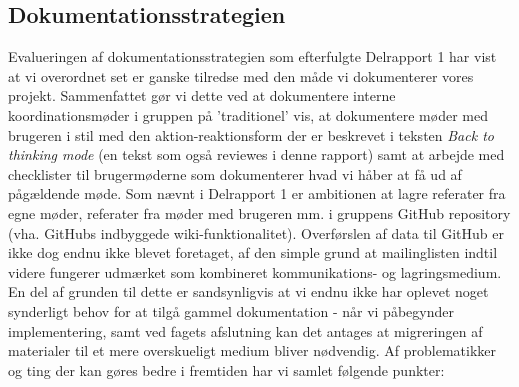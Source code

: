 \documentclass[10pt,a4paper,danish]{article}
\begin{document}
\subsection{Dokumentationsstrategien}
Evalueringen af dokumentationsstrategien som efterfulgte Delrapport 1 har vist at vi overordnet set er ganske tilredse med den måde vi dokumenterer vores projekt. Sammenfattet gør vi dette ved at dokumentere interne koordinationsmøder i gruppen på 'traditionel' vis, at dokumentere møder med brugeren i stil med den aktion-reaktionsform der er beskrevet i teksten \emph{Back to thinking mode} (en tekst som også reviewes i denne rapport) samt at arbejde med checklister til brugermøderne som dokumenterer hvad vi håber at få ud af pågældende møde. 
\newline
\newline
Som nævnt i Delrapport 1 er ambitionen at lagre referater fra egne møder, referater fra møder med brugeren mm. i gruppens GitHub repository (vha. GitHubs indbyggede wiki-funktionalitet). Overførslen af data til GitHub er ikke dog endnu ikke blevet foretaget, af den simple grund at mailinglisten indtil videre fungerer udmærket som kombineret kommunikations- og lagringsmedium. En del af grunden til dette er sandsynligvis at vi endnu ikke har oplevet noget synderligt behov for at tilgå gammel dokumentation - når vi påbegynder implementering, samt ved fagets afslutning kan det antages at migreringen af materialer til et mere overskueligt medium bliver nødvendig.
\newline
\newline
Af problematikker og ting der kan gøres bedre i fremtiden har vi samlet følgende punkter: 
\newline
\newline
\end{document}
